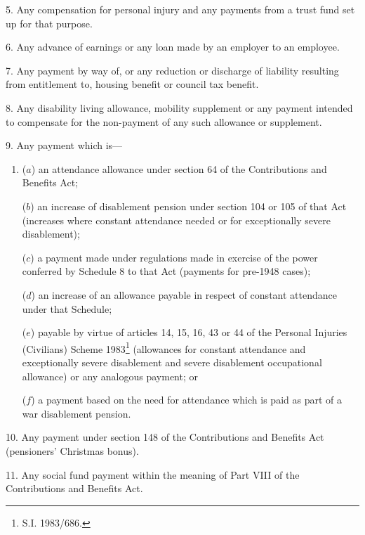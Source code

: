 \documentclass[12pt,a4paper]{article}
\begin{document}
\medskip

5.  Any compensation for personal injury and any payments from a trust fund set up for that purpose.

\medskip

6.  Any advance of earnings or any loan made by an employer to an employee.

\medskip

7.  Any payment by way of, or any reduction or discharge of liability resulting from entitlement to, housing benefit or council tax benefit.

\medskip

8.  Any disability living allowance, mobility supplement or any payment intended to compensate for the non-payment of any such allowance or supplement.

\medskip

9.  Any payment which is—
\begin{enumerate}\item[]
($a$) an attendance allowance under section 64 of the Contributions and Benefits Act;

($b$) an increase of disablement pension under section 104 or 105 of that Act (increases where constant attendance needed or for exceptionally severe disablement);

($c$) a payment made under regulations made in exercise of the power conferred by Schedule 8 to that Act (payments for pre-1948 cases);

($d$) an increase of an allowance payable in respect of constant attendance under that Schedule;

($e$) payable by virtue of articles 14, 15, 16, 43 or 44 of the Personal Injuries (Civilians) Scheme 1983\footnote{\frenchspacing S.I. 1983/686.} (allowances for constant attendance and exceptionally severe disablement and severe disablement occupational allowance) or any analogous payment; or

($f$) a payment based on the need for attendance which is paid as part of a war disablement pension.
\end{enumerate}

\medskip

10.  Any payment under section 148 of the Contributions and Benefits Act (pensioners' Christmas bonus).

\medskip

11.  Any social fund payment within the meaning of Part VIII of the Contributions and Benefits Act.

\medskip
\end{document}
